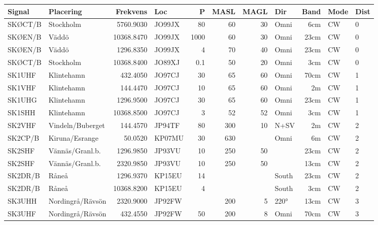 \scriptsize

\begin{longtable}{llrlrrrlrll}
	Signal   & Placering           &   Frekvens & Loc    &    P & MASL & MAGL & Dir     &  Band & Mode   & Dist \\ \hline
	SKØCT/B  & Stockholm           &  5760.9030 & JO99JX &   80 &   60 &   30 & Omni    &   6cm & CW     & 0    \\
	SKØEN/B  & Väddö               & 10368.8470 & JO99JX & 1000 &   60 &   30 & Omni    &  23cm & CW     & 0    \\
	SKØEN/B  & Väddö               &  1296.8350 & JO99JX &    4 &   70 &   40 & Omni    &  23cm & CW     & 0    \\
	SKØCT/B  & Stockholm           & 10368.8400 & JO89XJ &  0.1 &   50 &   20 & Omni    &   3cm & CW     & 0    \\
	SK1UHF   & Klintehamn          &   432.4050 & JO97CJ &   30 &   65 &   60 & Omni    &  70cm & CW     & 1    \\
	SK1VHF   & Klintehamn          &   144.4470 & JO97CJ &   10 &   65 &   60 & Omni    &    2m & CW     & 1    \\
	SK1UHG   & Klintehamn          &  1296.9500 & JO97CJ &   30 &   65 &   60 & Omni    &  23cm & CW     & 1    \\
	SK1SHH   & Klintehamn          & 10368.8500 & JO97CJ &    3 &   52 &   52 & Omni    &   3cm & CW     & 1    \\
	SK2VHF   & Vindeln/Buberget    &   144.4570 & JP94TF &   80 &  300 &   10 & N+SV    &    2m & CW     & 2    \\
	SK2CP/B  & Kiruna/Esrange      &    50.0520 & KP07MU &   30 &  630 &      & Omni    &    6m & CW     & 2    \\
	SK2SHF   & Vännäs/Granl.b.     &  1296.9850 & JP93VU &   10 &  250 &   50 &         &  23cm & CW     & 2    \\
	SK2SHF   & Vännäs/Granl.b.     &  2320.9850 & JP93VU &   10 &  250 &   50 &         &  13cm & CW     & 2    \\
	SK2DR/B  & Råneå               &  1296.9370 & KP15EU &   14 &      &      & South   &  23cm & CW     & 2    \\
	SK2DR/B  & Råneå               & 10368.8200 & KP15EU &    4 &      &      & South   &   3cm & CW     & 2    \\
	SK3UHH   & Nordingrå/Rävsön    &  2320.9000 & JP92FW &      &  200 &    5 & 220°    &  13cm & CW     & 3    \\
	SK3UHF   & Nordingrå/Rävsön    &   432.4550 & JP92FW &   50 &  200 &    8 & Omni    &  70cm & CW     & 3    \\

\end{longtable}
